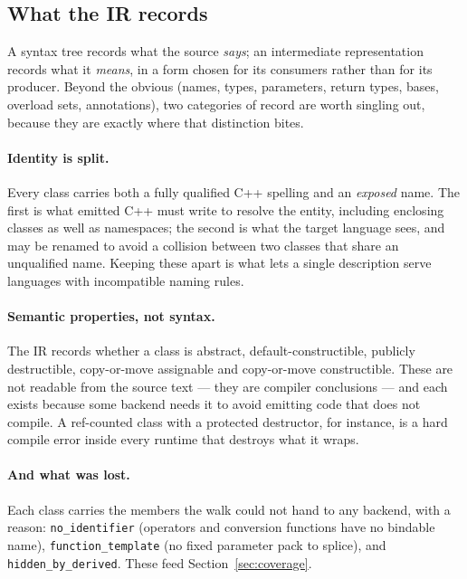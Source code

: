 \documentclass[11pt,a4paper]{article}
\newcommand{\code}[1]{\texttt{\small #1}}
\begin{document}
\subsection{What the IR records}

A syntax tree records what the source \emph{says}; an intermediate
representation records what it \emph{means}, in a form chosen for its consumers
rather than for its producer. Beyond the obvious (names, types, parameters,
return types, bases, overload sets, annotations), two categories of record are
worth singling out, because they are exactly where that distinction bites.

\paragraph{Identity is split.} Every class carries both a fully qualified C++
spelling and an \emph{exposed} name. The first is what emitted C++ must write to
resolve the entity, including enclosing classes as well as namespaces; the
second is what the target language sees, and may be renamed to avoid a collision
between two classes that share an unqualified name. Keeping these apart is what
lets a single description serve languages with incompatible naming rules.

\paragraph{Semantic properties, not syntax.} The IR records whether a class is
abstract, default-constructible, publicly destructible, copy-or-move assignable
and copy-or-move constructible. These are not readable from the source text ---
they are compiler conclusions --- and each exists because some backend needs it
to avoid emitting code that does not compile. A ref-counted class with a
protected destructor, for instance, is a hard compile error inside every runtime
that destroys what it wraps.

\paragraph{And what was lost.} Each class carries the members the walk could not
hand to any backend, with a reason: \code{no\_identifier} (operators and
conversion functions have no bindable name), \code{function\_template} (no fixed
parameter pack to splice), and \code{hidden\_by\_derived}. These feed
Section~\ref{sec:coverage}.

\end{document}
